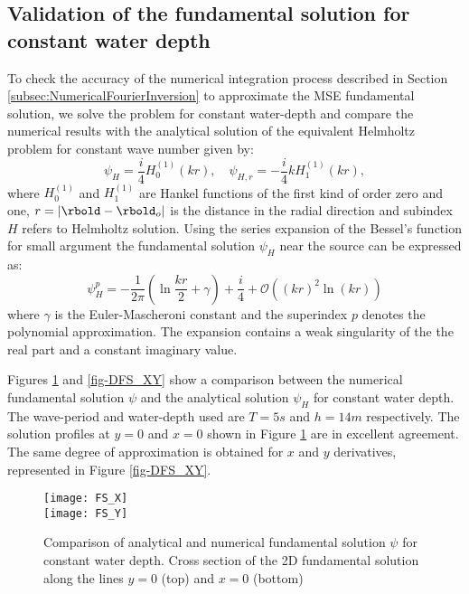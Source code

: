 \subsection{Validation of the fundamental solution for constant water depth}
To check the accuracy of the numerical integration process described in Section \ref{subsec:NumericalFourierInversion} to approximate the MSE fundamental solution, we solve the problem for constant water-depth and compare the numerical results with the analytical solution of the equivalent Helmholtz problem for constant wave number given by:
%
\begin{equation}
\psi_{H}=  \dfrac{i}{4} H_{0}^{(1)}(kr) , \quad
\psi_{H,r} = - \dfrac{i}{4} k H_{1}^{(1)}(kr),
\end{equation}
%
where $H_{0}^{(1)}$ and $H_{1}^{(1)}$ are Hankel functions of the first kind of order zero and one, $r=\vert \rbold-\rbold_o\vert$ is the distance in the radial direction and subindex $H$ refers to Helmholtz solution. Using the series expansion of the Bessel's function for small argument \cite{Abramowitz} the fundamental solution $\psi_H$ near the source can be expressed as:
\begin{equation}
\psi_{H}^p = -\frac{1}{2\pi} (\ln\frac{kr}{2}+\gamma) + \frac{i}{4} + \mathcal{O} \left( (kr)^2\ln(kr) \right)
\label{eqn:seriesPhiH}
\end{equation}
where $\gamma$ is the Euler-Mascheroni constant and the superindex $p$ denotes the polynomial approximation. The expansion contains a weak singularity of the the real part and a constant imaginary value.

Figures \ref{fig-FS_XY} and \ref{fig-DFS_XY} show a comparison between the numerical fundamental solution $\psi$ and the analytical solution $\psi_{H}$ for constant water depth. The wave-period and water-depth used are $T=5s$ and $h=14m$ respectively. The solution profiles at $y=0$ and $x=0$ shown in Figure \ref{fig-FS_XY} are in excellent agreement. The same degree of approximation is obtained for $x$ and $y$ derivatives, represented in Figure \ref{fig-DFS_XY}. 

\begin{figure}
\begin{center}
\texttt{[image: FS\_X]} \\
\texttt{[image: FS\_Y]}
\caption{Comparison of analytical and numerical fundamental solution $\psi$ for constant water depth. Cross section of the 2D fundamental solution along the lines $y=0$ (top) and $x=0$ (bottom)}
\label{fig-FS_XY}
\end{center}
\end{figure}


